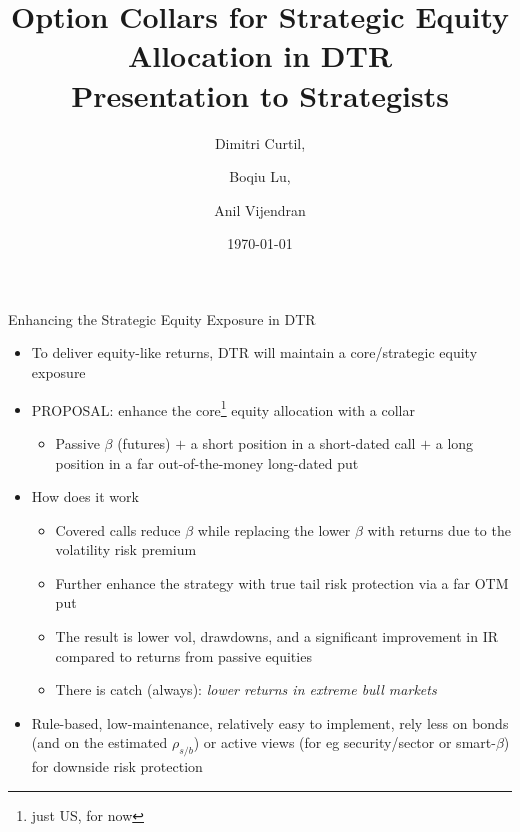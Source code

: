 \documentclass{beamer}
\title[Better Strategic $\beta$]{Option Collars for Strategic Equity Allocation in DTR\\Presentation to Strategists}
\author[DC, BL, AV]{Dimitri Curtil, \and Boqiu Lu, \and Anil Vijendran}
\date{\today}
\begin{document}
\begin{frame}
  \titlepage
\end{frame}

\begin{frame}{Enhancing the Strategic Equity Exposure in DTR}
	\begin{itemize}
		\item To deliver equity-like returns, DTR will maintain a core/strategic equity exposure
		\item PROPOSAL: enhance the core\footnote{just US, for now} equity allocation with a collar
			\begin{itemize} \item Passive $\beta$ (futures) $+$ a short position in a short-dated call $+$ a long position in a far out-of-the-money long-dated put \end{itemize}
	
		\item How does it work
			\begin{itemize}
			\item Covered calls reduce $\beta$ while replacing the lower $\beta$ with returns due to the volatility risk premium
			\item Further enhance the strategy with true tail risk protection via a far OTM put
			\item The result is lower vol, drawdowns, and a significant improvement in IR compared to returns from passive equities 
			\item There is catch (always): \emph{lower returns in extreme bull markets}
			\end{itemize}

		\item Rule-based, low-maintenance, relatively easy to implement, rely less on bonds (and on the estimated $\rho_{s/b}$) or active views (for eg security/sector or smart-$\beta$) for downside risk protection
	\end{itemize}

\end{frame}
\end{document}
